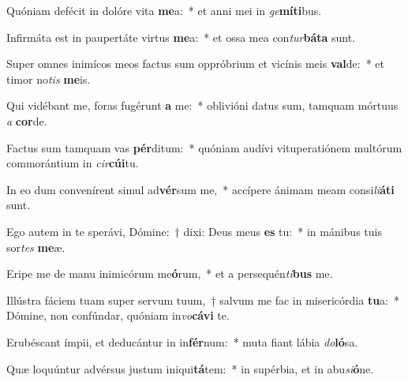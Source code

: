 \item Quóniam defécit in dolóre vita \textbf{me}a:~* et anni mei in \textit{ge}\textbf{mí}\textbf{ti}bus.
\item Infirmáta est in paupertáte virtus \textbf{me}a:~* et ossa mea con\textit{tur}\textbf{bá}\textbf{ta} sunt.
\item Super omnes inimícos meos factus sum oppróbrium et vicínis meis \textbf{val}de:~* et timor no\textit{tis} \textbf{me}is.
\item Qui vidébant me, foras fugérunt \textbf{a} me:~* oblivióni datus sum, tamquam mórtuus \textit{a} \textbf{cor}de.
\item Factus sum tamquam vas \textbf{pér}ditum:~* quóniam audívi vituperatiónem multórum commorántium in \textit{cir}\textbf{cú}\textbf{i}tu.
\item In eo dum convenírent simul ad\textbf{vér}sum me,~* accípere ánimam meam consi\textit{li}\textbf{á}\textbf{ti} sunt.
\item Ego autem in te sperávi, Dómine:~† dixi: Deus meus \textbf{es} tu:~* in mánibus tuis sor\textit{tes} \textbf{me}æ.
\item Eripe me de manu inimicórum me\textbf{ó}rum,~* et a persequén\textit{ti}\textbf{bus} me.
\item Illústra fáciem tuam super servum tuum,~† salvum me fac in misericórdia \textbf{tu}a:~* Dómine, non confúndar, quóniam in\textit{vo}\textbf{cá}\textbf{vi} te.
\item Erubéscant ímpii, et deducántur in in\textbf{fér}num:~* muta fiant lábia \textit{do}\textbf{ló}sa.
\item Quæ loquúntur advérsus justum iniqui\textbf{tá}tem:~* in supérbia, et in abu\textit{si}\textbf{ó}ne.
